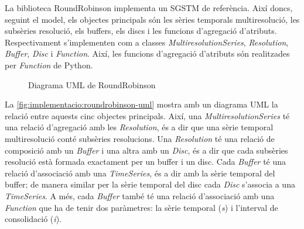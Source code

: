 La biblioteca RoundRobinson implementa un SGSTM de referència. Així
doncs, seguint el model, els objectes principals són les sèries
temporals multiresolució, les subsèries resolució, els buffers, els
discs i les funcions d'agregació d'atributs. Respectivament
s'implementen com a classes \emph{MultiresolutionSeries},
\emph{Resolution}, \emph{Buffer}, \emph{Disc} i \emph{Function}.
Així, les funcions d'agregació d'atributs són realitzades per
\emph{Function} de Python.


\begin{figure}[tp]
  \centering


  \caption{Diagrama UML de RoundRobinson}
  \label{fig:implementacio:roundrobinson-uml}
\end{figure}



La \autoref{fig:implementacio:roundrobinson-uml} mostra amb un
diagrama UML la relació entre aquests cinc objectes principals. Així,
una \emph{MultiresolutionSeries} té una relació d'agregació amb les
\emph{Resolution}, és a dir que una sèrie temporal multiresolució
conté subsèries resolucions.  Una \emph{Resolution} té una relació de
composició amb un \emph{Buffer} i una altra amb un \emph{Disc}, és a
dir que cada subsèries resolució està formada exactament per un buffer
i un disc. Cada \emph{Buffer} té una relació d'associació amb una
\emph{TimeSeries}, és a dir amb la sèrie temporal del buffer; de
manera similar per la sèrie temporal del disc cada \emph{Disc}
s'associa a una \emph{TimeSeries}. A més, cada \emph{Buffer} també té
una relació d'associació amb una \emph{Function} que ha de tenir dos
paràmetres: la sèrie temporal (\emph{s}) i l'interval de consolidació
(\emph{i}).



